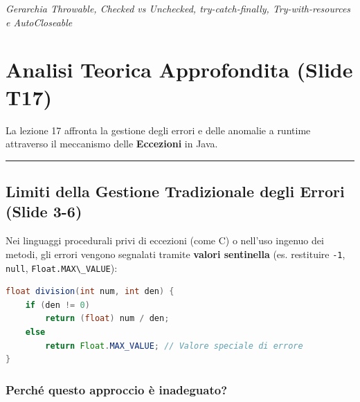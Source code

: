 \documentclass[11pt,a4paper,oneside]{report}
\newcommand{\passthrough}[1]{#1}
\begin{document}
{\small\sffamily\color{accentblue!80!black}\textit{Gerarchia Throwable, Checked vs Unchecked, try-catch-finally, Try-with-resources e AutoCloseable}}

\vspace{0.8em}

\section{Analisi Teorica Approfondita (Slide
T17)}\label{chap16_analisi-teorica-approfondita-slide-t17}

La lezione 17 affronta la gestione degli errori e delle anomalie a
runtime attraverso il meccanismo delle \textbf{Eccezioni} in Java.

\begin{center}\rule{0.5\linewidth}{0.5pt}\end{center}

\subsection{Limiti della Gestione Tradizionale degli Errori (Slide
3-6)}\label{chap16_limiti-della-gestione-tradizionale-degli-errori-slide-3-6}

Nei linguaggi procedurali privi di eccezioni (come C) o nell'uso ingenuo
dei metodi, gli errori vengono segnalati tramite \textbf{valori
sentinella} (es. restituire \passthrough{\lstinline!-1!},
\passthrough{\lstinline!null!},
\passthrough{\lstinline!Float.MAX\_VALUE!}):

\begin{lstlisting}[language=Java]
float division(int num, int den) {
    if (den != 0)
        return (float) num / den;
    else
        return Float.MAX_VALUE; // Valore speciale di errore
}
\end{lstlisting}

\subsubsection{Perché questo approccio è
inadeguato?}\label{chap16_perchuxe9-questo-approccio-uxe8-inadeguato}
\end{document}
